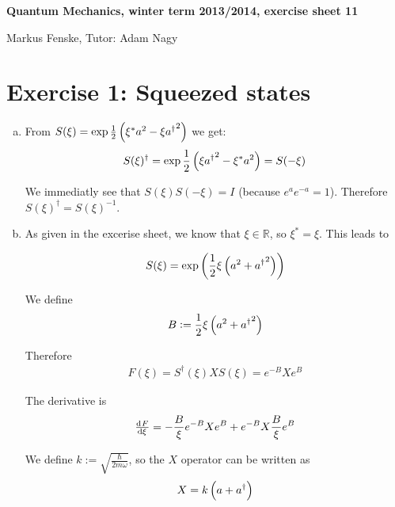 \documentclass[a4paper,german,12pt,smallheadings]{scrartcl}
\begin{document}
\allowdisplaybreaks %
\begin{center}
\bfseries %
\sffamily %
\vspace{-40pt}
Quantum Mechanics, winter term 2013/2014, exercise sheet 11

Markus Fenske, Tutor: Adam Nagy
\vspace{-10pt}
\end{center}

\section*{Exercise 1: Squeezed states}
\begin{enumerate}[a)]
  \item
    From $S(\xi) = \exp \frac{1}{2} \del{\xi^* a^2 - \xi {a^\dagger}^2}$ we get:
    \begin{align*}
      S(\xi)^\dagger = \exp \frac{1}{2} \del{\xi {a^\dagger}^2 - \xi^* a^2} = S(-\xi)
    \end{align*}

    We immediatly see that $S(\xi)S(-\xi) = I$ (because $e^a e^{-a} = 1$).
    Therefore $S(\xi)^\dagger = S(\xi)^{-1}$.
  \item
    As given in the excerise sheet, we know that $\xi \in \mathbb{R}$, so
    $\xi^* = \xi$. This leads to

    \begin{align*}
      S(\xi) = \exp\del{\frac{1}{2} \xi \del{a^2 + {a^\dagger}^2}}
    \end{align*}

    We define
    \begin{align*}
      B := \frac{1}{2} \xi \del{a^2 + {a^\dagger}^2}
    \end{align*}

    Therefore
    \begin{align*}
      F(\xi) = S^\dagger(\xi) X S(\xi) = e^{-B} X e^B
    \end{align*}

    The derivative is
    \begin{equation}
      \od{F}{\xi} = -\frac{B}{\xi}e^{-B}Xe^B + e^{-B}X \frac{B}{\xi}e^B
      \label{deriv}
    \end{equation}

    We define $k := \sqrt{\frac{\hbar}{2 m \omega}}$, so the $X$ operator can be written as
    \begin{align*}
      X = k\del{a + a^\dagger}
    \end{align*}


\end{enumerate}
\end{document}
